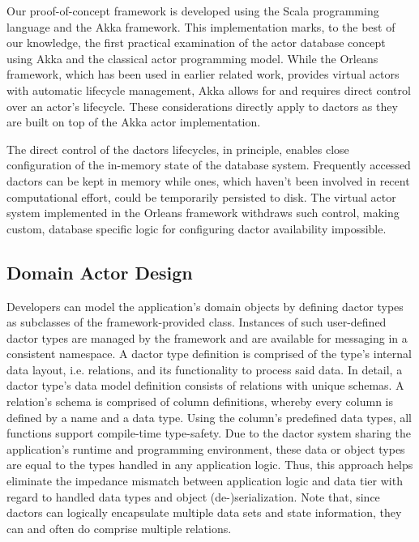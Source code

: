 Our proof-of-concept framework is developed using the Scala programming language and the Akka framework.
This implementation marks, to the best of our knowledge, the first practical examination of the actor database concept using Akka and the classical actor programming model.
While the Orleans framework, which has been used in earlier related work, provides virtual actors with automatic lifecycle management, Akka allows for and requires direct control over an actor's lifecycle.
These considerations directly apply to \glspl{dactor} as they are built on top of the Akka actor implementation.

The direct control of the \glspl{dactor} lifecycles, in principle, enables close configuration of the in-memory state of the database system.
Frequently accessed \glspl{dactor} can be kept in memory while ones, which haven't been involved in recent computational effort, could be temporarily persisted to disk.
The virtual actor system implemented in the Orleans framework withdraws such control, making custom, database specific logic for configuring \gls{dactor} availability impossible.

\subsection{Domain Actor Design}\label{subsec:domain_actor_design}

Developers can model the application's domain objects by defining \gls{dactor} types as subclasses of the framework-provided  class.
Instances of such user-defined \gls{dactor} types are managed by the framework and are available for messaging in a consistent namespace.
A \gls{dactor} type definition is comprised of the type's internal data layout, i.e. \glspl{relation}, and its functionality to process said data.
In detail, a \gls{dactor} type's data model definition consists of \glspl{relation} with unique schemas.
A \gls{relation}'s schema is comprised of column definitions, whereby every column is defined by a name and a data type.
Using the column's predefined data types, all functions support compile-time type-safety.
Due to the \gls{dactor} system sharing the application's runtime and programming environment, these data or object types are equal to the types handled in any application logic.
Thus, this approach helps eliminate the impedance mismatch between application logic and data tier with regard to handled data types and object (de-)serialization.
Note that, since \glspl{dactor} can logically encapsulate multiple data sets and state information, they can and often do comprise multiple \glspl{relation}.

